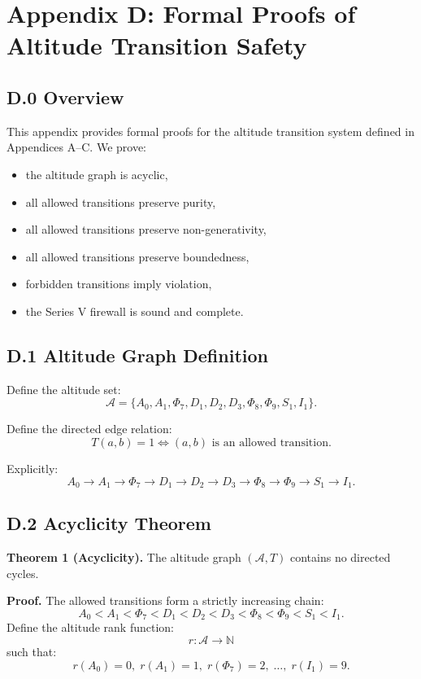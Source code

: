 \appendix
\section*{Appendix D: Formal Proofs of Altitude Transition Safety}

\subsection*{D.0 Overview}

This appendix provides formal proofs for the altitude transition system
defined in Appendices A–C.  
We prove:
\begin{itemize}
    \item the altitude graph is acyclic,
    \item all allowed transitions preserve purity,
    \item all allowed transitions preserve non-generativity,
    \item all allowed transitions preserve boundedness,
    \item forbidden transitions imply violation,
    \item the Series V firewall is sound and complete.
\end{itemize}

\subsection*{D.1 Altitude Graph Definition}

Define the altitude set:
\[
\mathcal{A} =
\{A_0, A_1, \Phi_7, D_1, D_2, D_3, \Phi_8, \Phi_9, S_1, I_1\}.
\]

Define the directed edge relation:
\[
T(a,b) = 1 \iff (a,b) \text{ is an allowed transition}.
\]

Explicitly:
\[
A_0 \to A_1 \to \Phi_7 \to D_1 \to D_2 \to D_3 \to
\Phi_8 \to \Phi_9 \to S_1 \to I_1.
\]

\subsection*{D.2 Acyclicity Theorem}

\textbf{Theorem 1 (Acyclicity).}  
The altitude graph $(\mathcal{A},T)$ contains no directed cycles.

\textbf{Proof.}  
The allowed transitions form a strictly increasing chain:
\[
A_0 < A_1 < \Phi_7 < D_1 < D_2 < D_3 < \Phi_8 < \Phi_9 < S_1 < I_1.
\]
Define the altitude rank function:
\[
r : \mathcal{A} \to \mathbb{N}
\]
such that:
\[
r(A_0)=0,\; r(A_1)=1,\; r(\Phi_7)=2,\; \dots,\; r(I_1)=9.
\]

